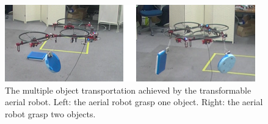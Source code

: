 \begin{figure}[t]
  \begin{center}
    \includegraphics[width=1.0\columnwidth]{figs/object_transportation.png}
  \end{center}
  \caption{The multiple object transportation achieved by the transformable aerial robot. Left: the aerial robot grasp one object. Right: the aerial robot grasp two objects.}
  \label{figure:system}
\end{figure}
